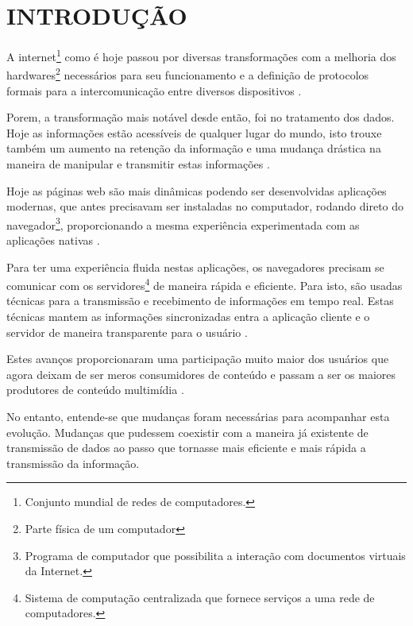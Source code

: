 \section{INTRODUÇÃO}

A internet\footnote{Conjunto mundial de redes de computadores.} como é hoje passou por diversas transformações com a melhoria dos hardwares\footnote{Parte física de um computador} necessários para seu funcionamento e a definição de protocolos formais para a intercomunicação entre diversos dispositivos \cite{Aghaei2012}.

Porem, a transformação mais notável desde então, foi no tratamento dos dados. Hoje as informações estão acessíveis de qualquer lugar do mundo, isto trouxe também um aumento na retenção da informação e uma mudança drástica na maneira de manipular e transmitir estas informações \cite{Leiner2009}.

Hoje as páginas web são mais dinâmicas podendo ser desenvolvidas aplicações modernas, que antes precisavam ser instaladas no computador, rodando direto do navegador\footnote{Programa de computador que possibilita a interação com documentos virtuais da Internet.},  proporcionando a mesma experiência experimentada com as aplicações nativas \cite{Garrett2005}.

Para ter uma experiência fluida nestas aplicações, os navegadores precisam se comunicar com os servidores\footnote{Sistema de computação centralizada que fornece serviços a uma rede de computadores.} de maneira rápida e eficiente. Para isto, são usadas técnicas para a transmissão e recebimento de informações em tempo real. Estas técnicas mantem as informações sincronizadas entra a aplicação cliente e o servidor de maneira transparente para o usuário \cite{offutt2002quality}.

Estes avanços proporcionaram uma participação muito maior dos usuários que agora deixam de ser meros consumidores de conteúdo e passam a ser os maiores produtores de conteúdo multimídia \cite{Aghaei2012}.

No entanto, entende-se que mudanças foram necessárias para acompanhar esta evolução. Mudanças que pudessem coexistir com a maneira já existente de transmissão de dados ao passo que tornasse mais eficiente e mais rápida a transmissão da informação.

